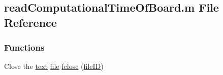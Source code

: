 \hypertarget{a00114}{}\subsection{read\+Computational\+Time\+Of\+Board.\+m File Reference}
\label{a00114}
\subsubsection*{Functions}
\begin{DoxyCompactItemize}
\item 
Close the \hyperlink{a00114_ac3ed6ea030e1a1d6234b110347cad11e}{text} \hyperlink{a00114_afb14c82a145a51f20aea2593e1d84b86}{file} \hyperlink{a00114_a9a3043eed208fc59883c3d1fcdee2df9}{fclose} (\hyperlink{a00114_a0535e16c4a03a88fd449c86dc20c47c4}{file\+I\+D})
\end{DoxyCompactItemize}
